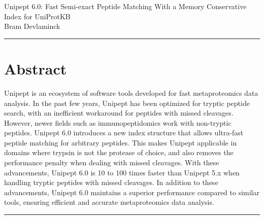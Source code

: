 \documentclass[11pt]{article}
\begin{document}
    \begingroup
    \centering
    \LARGE Unipept 6.0: Fast Semi-exact Peptide Matching With a Memory Conservative Index for UniProtKB\\[1em]
    \large Bram Devlaminck\\[2em]
    \endgroup

    \par\noindent\rule{\linewidth}{.5pt}
    \section*{Abstract}\label{sec:test-section}
    Unipept is an ecosystem of software tools developed for fast metaproteomics data analysis.
    In the past few years, Unipept has been optimized for tryptic peptide search, with an inefficient workaround for peptides with missed cleavages.
    However, newer fields such as immunopeptidomics work with non-tryptic peptides.
    Unipept 6.0 introduces a new index structure that allows ultra-fast peptide matching for arbitrary peptides.
    This makes Unipept applicable in domains where trypsin is not the protease of choice, and also removes the performance penalty when dealing with missed cleavages.
    With these advancements, Unipept 6.0 is 10 to 100 times faster than Unipept 5.x when handling tryptic peptides with missed cleavages.
    In addition to these advancements, Unipept 6.0 maintains a superior performance compared to similar tools, ensuring efficient and accurate metaproteomics data analysis.
    \par\noindent\rule{\linewidth}{.5pt}
\end{document}
